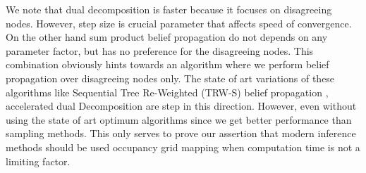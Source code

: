 \documentclass[letterpaper, 10 pt, conference]{ieeeconf} %
\begin{document}
We note that dual decomposition is faster because it focuses on disagreeing
nodes. However, step size is crucial parameter that affects speed of
convergence. On the other hand sum product belief propagation do not depends
on any parameter factor, but has no preference for the disagreeing nodes.
This combination obviously hints towards an algorithm where we perform 
belief propagation over disagreeing nodes only. The state of art variations 
of these algorithms like Sequential Tree Re-Weighted (TRW-S) belief
propagation \cite{kolmogorov2006convergent}, accelerated dual Decomposition
\cite{jojic2010accelerated} are step in this direction.
However, even without using the state of art optimum algorithms since we get
better performance than sampling methods. This only serves to prove our
assertion that modern inference methods should be used occupancy grid mapping 
when computation time is not a limiting factor.


\end{document}
